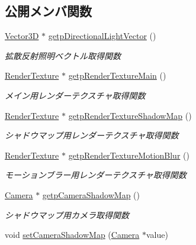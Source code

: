 \subsection*{公開メンバ関数}
\begin{DoxyCompactItemize}
\item 
\mbox{\hyperlink{class_vector3_d}{Vector3D}} $\ast$ \mbox{\hyperlink{class_draw_common_data_a114bdbc03af787ffb0860e1ae9ec6ef9}{getp\+Directional\+Light\+Vector}} ()
\begin{DoxyCompactList}\small\item\em 拡散反射照明ベクトル取得関数 \end{DoxyCompactList}\item 
\mbox{\hyperlink{class_render_texture}{Render\+Texture}} $\ast$ \mbox{\hyperlink{class_draw_common_data_ac61796a143057a2d0ab729be59287e7c}{getp\+Render\+Texture\+Main}} ()
\begin{DoxyCompactList}\small\item\em メイン用レンダーテクスチャ取得関数 \end{DoxyCompactList}\item 
\mbox{\hyperlink{class_render_texture}{Render\+Texture}} $\ast$ \mbox{\hyperlink{class_draw_common_data_a085ce497bd36164c253b1c3200287180}{getp\+Render\+Texture\+Shadow\+Map}} ()
\begin{DoxyCompactList}\small\item\em シャドウマップ用レンダーテクスチャ取得関数 \end{DoxyCompactList}\item 
\mbox{\hyperlink{class_render_texture}{Render\+Texture}} $\ast$ \mbox{\hyperlink{class_draw_common_data_a2b356433718b5027d3f50d8860a9d6ff}{getp\+Render\+Texture\+Motion\+Blur}} ()
\begin{DoxyCompactList}\small\item\em モーションブラー用レンダーテクスチャ取得関数 \end{DoxyCompactList}\item 
\mbox{\hyperlink{class_camera}{Camera}} $\ast$ \mbox{\hyperlink{class_draw_common_data_a08fceba2155d3a45a3004b0aba97ea2a}{getp\+Camera\+Shadow\+Map}} ()
\begin{DoxyCompactList}\small\item\em シャドウマップ用カメラ取得関数 \end{DoxyCompactList}\item 
void \mbox{\hyperlink{class_draw_common_data_adc69a051e339523a6f0c5e1826694458}{set\+Camera\+Shadow\+Map}} (\mbox{\hyperlink{class_camera}{Camera}} $\ast$value)

\end{DoxyCompactItemize}
